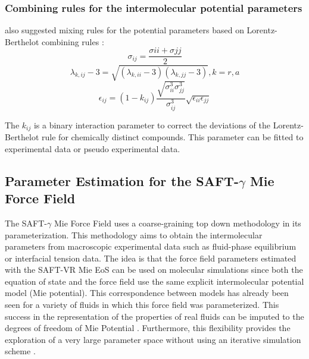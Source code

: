 	\subsubsection{Combining rules for the intermolecular potential parameters}
	 also suggested mixing rules for the potential parameters based on Lorentz-Berthelot combining rules \cite{rowlinson}:
	\begin{equation}
	\sigma_{ij} =\frac{\sigma{ii}+\sigma{jj}}{2}
	\label{eqn:sigmamix}
	\end{equation}
	\begin{equation}
	\lambda_{k,ij} -3 =\sqrt{(\lambda_{k,ii}-3)(\lambda_{k,jj}-3)} , k=r,a
	\label{eqn:lambdamix}
	\end{equation}
	\begin{equation}
	\epsilon_{ij} =(1-k_{ij})\frac{\sqrt{\sigma_{ii}^{3}\sigma_{jj}^{3}}}{\sigma_{ij}^{3}}\sqrt{\epsilon_{ii}\epsilon_{jj}}
	\label{eqn:epsmix}
	\end{equation}
	
	The $k_{ij}$ is a binary interaction parameter to correct the deviations of the Lorentz-Berthelot rule for chemically distinct compounds. This parameter can be fitted to experimental data or pseudo experimental data.
	
	
	\subsection{Parameter Estimation for the SAFT-$\gamma$ Mie Force Field}\label{parsaft}
	
	The SAFT-$\gamma$ Mie Force Field uses a coarse-graining top down methodology in its parameterization. This methodology aims to obtain the intermolecular parameters from macroscopic experimental data such as fluid-phase equilibrium or interfacial tension data. The idea is that the force field  parameters estimated with the SAFT-VR Mie EoS can be used on molecular simulations since both the equation of state and the force field use the same explicit intermolecular potential model (Mie potential). This correspondence between models has already been seen for a variety of fluids in which this force field was parameterized. This success in the representation of the properties of real fluids can be imputed to the degrees of freedom of Mie Potential \cite{herdes2015}. Furthermore, this flexibility provides the exploration of a very large parameter space without using an iterative simulation scheme \cite{avendano2011}. 
	
